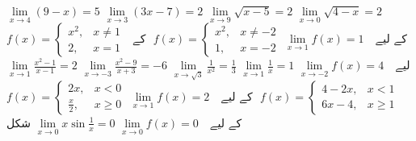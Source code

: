 $\lim\limits_{x\to 4} (9-x)=5$
$\lim\limits_{x\to 3} (3x-7)=2$
$\lim\limits_{x\to 9} \sqrt{x-5}=2$
$\lim\limits_{x\to 0} \sqrt{4-x}=2$
$f(x)=\begin{cases} x^2,&x\ne 1\\ 2,&x=1 \end{cases}$\,\,
کے لیے \,\,
$\lim\limits_{x\to 1} f(x)=1$
$f(x)=\begin{cases} x^2,&x\ne -2\\ 1,&x=-2 \end{cases}$\,\,
کے لیے \,\,
$\lim\limits_{x\to -2} f(x)=4$
$\lim\limits_{x\to 1} \tfrac{1}{x}=1$
$\lim\limits_{x\to \sqrt{3}} \tfrac{1}{x^2}=\tfrac{1}{3}$
$\lim\limits_{x\to -3} \tfrac{x^2-9}{x+3}=-6$
$\lim\limits_{x\to 1} \tfrac{x^2-1}{x-1}=2$
$f(x)=\begin{cases} 4-2x,&x<1\\ 6x-4,&x\ge 1 \end{cases}$\,\,
کے لیے \,\,
$\lim\limits_{x\to 1} f(x)=2$
$f(x)=\begin{cases} 2x,&x<0\\  \tfrac{x}{2},&x\ge 0 \end{cases}$\,\,
کے لیے \,\,
$\lim\limits_{x\to 0} f(x)=0$
$\lim\limits_{x\to 0} x\sin \tfrac{1}{x}=0$\quad
شکل 
